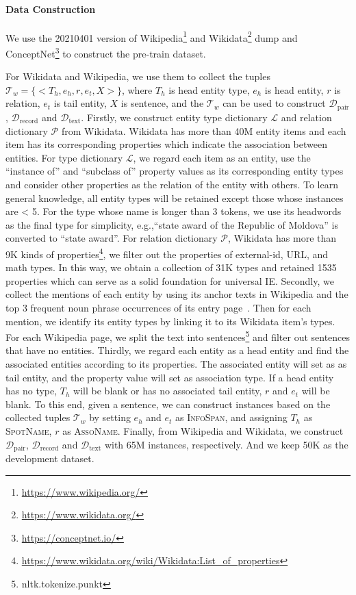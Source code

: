 \documentclass[11pt]{article}
\begin{document}
\paragraph{Data Construction}
We use the 20210401 version of Wikipedia\footnote{\url{https://www.wikipedia.org/}} and Wikidata\footnote{\url{https://www.wikidata.org/}} dump and ConceptNet\footnote{\url{https://conceptnet.io/}} to construct the pre-train dataset.

For Wikidata and Wikipedia, we use them to collect the tuples $\mathcal{T}_w = \{<T_h, e_h, r, e_t, X> \}$, where $T_h$ is head entity type, $e_h$ is head entity, $r$ is relation, $e_t$ is tail entity, $X$ is sentence, and the $\mathcal{T}_w$ can be used to construct $\mathcal{D}_{\text{pair}}$, $\mathcal{D}_{\text{record}}$ and $\mathcal{D}_{\text{text}}$. Firstly, we construct entity type dictionary $\mathcal{L}$ and relation dictionary $\mathcal{P}$ from Wikidata. Wikidata has more than 40M entity items and each item has its corresponding properties which indicate the association between entities. For type dictionary $\mathcal{L}$, we regard each item as an entity, use the “instance of” and “subclass of” property values as its corresponding entity types and consider other properties as the relation of the entity with others. To learn general knowledge, all entity types will be retained except those whose instances are < 5. For the type whose name is longer than 3 tokens, we use its headwords as the final type for simplicity, e.g.,“state award of the Republic of Moldova” is converted to “state award”. For relation dictionary $\mathcal{P}$, Wikidata has more than 9K kinds of properties\footnote{\url{https://www.wikidata.org/wiki/Wikidata:List_of_properties}}, we filter out the properties of external-id, URL, and math types. In this way, we obtain a collection of 31K types and retained 1535 properties which can serve as a solid foundation for universal IE. Secondly, we collect the mentions of each entity by using its anchor texts in Wikipedia and the top 3 frequent noun phrase occurrences of its entry page~\citep{li-etal-2010-generating}. Then for each mention, we identify its entity types by linking it to its Wikidata item's types. For each Wikipedia page, we split the text into sentences\footnote{nltk.tokenize.punkt} and filter out sentences that have no entities. Thirdly, we regard each entity as a head entity and find the associated entities according to its properties. The associated entity will set as as tail entity, and the property value will set as association type. If a head entity has no type, $T_h$ will be blank or has no associated tail entity, $r$ and $e_t$ will be blank. To this end, given a sentence, we can construct instances based on the collected tuples $\mathcal{T}_w$ by setting $e_h$ and $e_t$ as \textsc{InfoSpan}, and assigning $T_h$ as \textsc{SpotName}, $r$ as \textsc{AssoName}. Finally, from Wikipedia and Wikidata, we construct $\mathcal{D}_{\text{pair}}$, $\mathcal{D}_{\text{record}}$ and $\mathcal{D}_{\text{text}}$ with 65M instances, respectively. And we keep 50K as the development dataset. 
\end{document}
